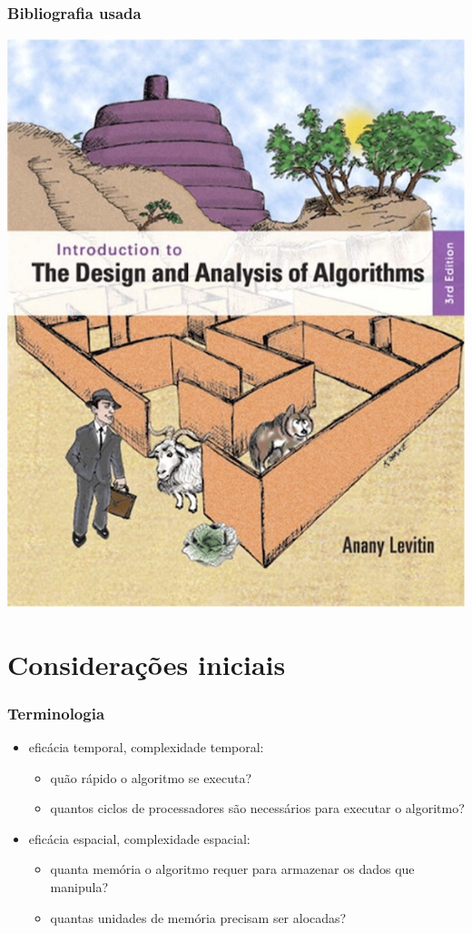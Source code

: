 \documentclass[handout]{beamer}
\begin{document}
\begin{frame}

  \frametitle{Bibliografia usada}

  \begin{center}
    \includegraphics[height=.8\textheight]{img/capa-levitin.jpg}
  \end{center}
\end{frame}

\section{Considerações iniciais}

\begin{frame}
  \frametitle{Terminologia}

  \begin{itemize}
  \item eficácia temporal, complexidade temporal:
    \begin{itemize}
    \item quão rápido o algoritmo se executa? 
    \item quantos ciclos de processadores são necessários para executar o
      algoritmo?
    \end{itemize}
  \item eficácia espacial, complexidade espacial:
    \begin{itemize}
    \item quanta memória o algoritmo requer para armazenar os dados que manipula?
    \item quantas unidades de memória precisam ser alocadas?
    \end{itemize}
  \end{itemize}
\end{frame}
\end{document}
